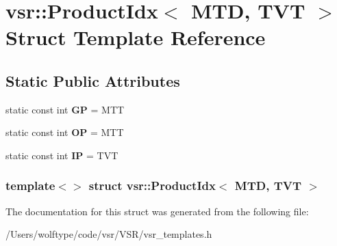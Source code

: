 \hypertarget{structvsr_1_1_product_idx_3_01_m_t_d_00_01_t_v_t_01_4}{\section{vsr\-:\-:Product\-Idx$<$ M\-T\-D, T\-V\-T $>$ Struct Template Reference}
\label{structvsr_1_1_product_idx_3_01_m_t_d_00_01_t_v_t_01_4}
}
\subsection*{Static Public Attributes}
\begin{DoxyCompactItemize}
\item 
\hypertarget{structvsr_1_1_product_idx_3_01_m_t_d_00_01_t_v_t_01_4_a67d9a528588d03d333577565cb0fa9ed}{static const int {\bfseries G\-P} = M\-T\-T}\label{structvsr_1_1_product_idx_3_01_m_t_d_00_01_t_v_t_01_4_a67d9a528588d03d333577565cb0fa9ed}

\item 
\hypertarget{structvsr_1_1_product_idx_3_01_m_t_d_00_01_t_v_t_01_4_a586563615cd8c44173b6c65de5a13a95}{static const int {\bfseries O\-P} = M\-T\-T}\label{structvsr_1_1_product_idx_3_01_m_t_d_00_01_t_v_t_01_4_a586563615cd8c44173b6c65de5a13a95}

\item 
\hypertarget{structvsr_1_1_product_idx_3_01_m_t_d_00_01_t_v_t_01_4_ad609384ae0e154b49f2bc35593db1424}{static const int {\bfseries I\-P} = T\-V\-T}\label{structvsr_1_1_product_idx_3_01_m_t_d_00_01_t_v_t_01_4_ad609384ae0e154b49f2bc35593db1424}

\end{DoxyCompactItemize}
\subsubsection*{template$<$$>$ struct vsr\-::\-Product\-Idx$<$ M\-T\-D, T\-V\-T $>$}



The documentation for this struct was generated from the following file\-:\begin{DoxyCompactItemize}
\item 
/\-Users/wolftype/code/vsr/\-V\-S\-R/vsr\-\_\-templates.\-h\end{DoxyCompactItemize}
